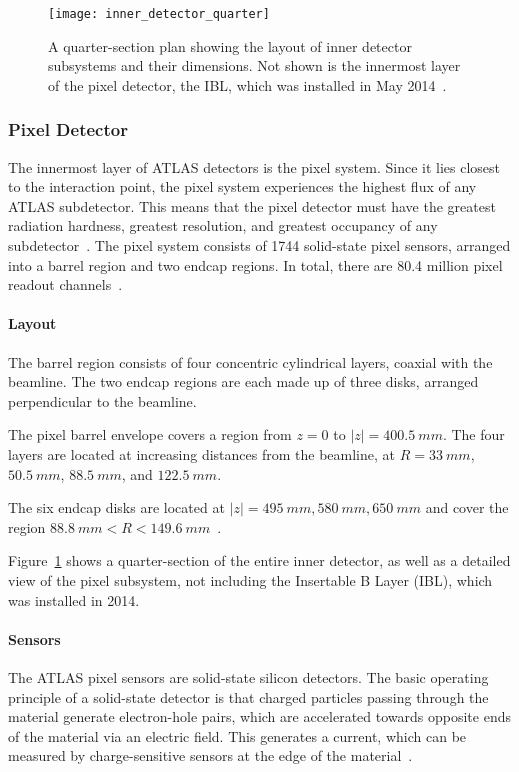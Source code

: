 \begin{figure}[!ht]\centering
\texttt{[image: inner\_detector\_quarter]}
\caption{A quarter-section plan showing the layout of inner detector subsystems and their dimensions.
Not shown is the innermost layer of the pixel detector, the IBL, which was installed in May 2014~\cite{lhc-machine-2008}.}
\label{fig:inner_detector_quarter}
\end{figure}

\subsubsection{Pixel Detector}\label{subsubsec:pixel}

The innermost layer of ATLAS detectors is the pixel system.
Since it lies closest to the interaction point, the pixel system experiences the highest flux of any ATLAS subdetector.
This means that the pixel detector must have the greatest radiation hardness, greatest resolution,
and greatest occupancy of any subdetector~\cite{atlas-detector-2008}.
The pixel system consists of 1744 solid-state pixel sensors, arranged into a barrel region and two endcap regions.
In total, there are 80.4 million pixel readout channels~\cite{atlas-detector-2008}.

\paragraph{Layout}
The barrel region consists of four concentric cylindrical layers, coaxial with the beamline.
The two endcap regions are each made up of three disks, arranged perpendicular to the beamline.

The pixel barrel envelope covers a region from $z = 0$ to $|z|  = 400.5~mm$.
The four layers are located at increasing distances from the beamline, at $R = 33~mm$, $50.5~mm$, $88.5~mm$, and $122.5~mm$.

The six endcap disks are located at $|z| = 495~mm, 580~mm, 650~mm$ and cover the region $88.8~mm < R < 149.6~mm$~\cite{atlas-detector-2008}.

Figure~\ref{fig:inner_detector_quarter} shows a quarter-section of
the entire inner detector, as well as a detailed view of the pixel
subsystem, not including the Insertable B Layer (IBL), which was
installed in 2014.

\paragraph{Sensors}
The ATLAS pixel sensors are solid-state silicon detectors.
The basic operating principle of a solid-state detector is that charged particles passing through the material
generate electron-hole pairs, which are accelerated towards opposite ends of the material via an electric field.
This generates a current, which can be measured by charge-sensitive sensors at the edge of the material~\cite{spieler-2005}.


